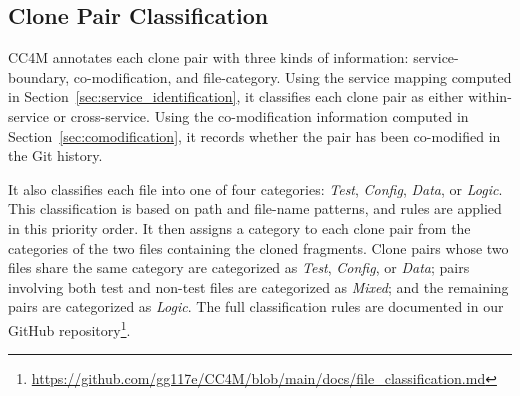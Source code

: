 \documentclass[conference]{IEEEtran}
\begin{document}
\subsection{Clone Pair Classification}
\label{sec:classification}

\textsc{CC4M} annotates each clone pair with three kinds of information:
service-boundary, co-modification, and file-category.
Using the service mapping computed in
Section~\ref{sec:service_identification}, it classifies each clone pair as either within-service or cross-service.
Using the
co-modification information computed in Section~\ref{sec:comodification},
it records whether the pair has been co-modified in the Git history.

It also classifies each file into one of four categories: \emph{Test},
\emph{Config}, \emph{Data}, or \emph{Logic}. This classification is based on path and
file-name patterns, and rules are applied in this priority order.
It then assigns a category to each clone pair from the categories
of the two files containing the cloned fragments. Clone pairs whose
two files share the same category are categorized as \emph{Test}, \emph{Config}, or
\emph{Data}; pairs involving both test and non-test files are categorized as
\emph{Mixed}; and the remaining pairs are categorized as \emph{Logic}. The full
classification rules are documented in our GitHub repository\footnote{\url{https://github.com/gg117e/CC4M/blob/main/docs/file_classification.md}}.

\end{document}
